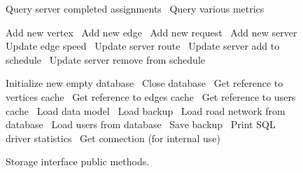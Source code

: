\documentclass{article}
\newcommand{\hi}[1]{\noindent {\bf #1}}     %
\def\nwendcode{\endtrivlist \endgroup}      %
\let\nwdocspar=\par
\theoremstyle{definition}                   %
\begin{document}
\begin{figure}
{\begin{minipage}[t]{0.5\textwidth}
\LA{}Query server completed assignments~{\nwtagstyle{}}\RA{}
\LA{}Query various metrics~{\nwtagstyle{}}\RA{}
\nwendcode{}\nwdocspar
\end{minipage}
\begin{minipage}[t]{0.5\textwidth}
\hi{Write Methods}
\nwenddocs{}\plusendmoddef
\LA{}Add new vertex~{\nwtagstyle{}}\RA{}
\LA{}Add new edge~{\nwtagstyle{}}\RA{}
\LA{}Add new request~{\nwtagstyle{}}\RA{}
\LA{}Add new server~{\nwtagstyle{}}\RA{}
\LA{}Update edge speed~{\nwtagstyle{}}\RA{}
\LA{}Update server route~{\nwtagstyle{}}\RA{}
\LA{}Update server add to schedule~{\nwtagstyle{}}\RA{}
\LA{}Update server remove from schedule~{\nwtagstyle{}}\RA{}
\nwendcode{}\nwdocspar
\hi{Utilities}
\nwenddocs{}\plusendmoddef
\LA{}Initialize new empty database~{\nwtagstyle{}}\RA{}
\LA{}Close database~{\nwtagstyle{}}\RA{}
\LA{}Get reference to vertices cache~{\nwtagstyle{}}\RA{}
\LA{}Get reference to edges cache~{\nwtagstyle{}}\RA{}
\LA{}Get reference to users cache~{\nwtagstyle{}}\RA{}
\LA{}Load data model~{\nwtagstyle{}}\RA{}
\LA{}Load backup~{\nwtagstyle{}}\RA{}
\LA{}Load road network from database~{\nwtagstyle{}}\RA{}
\LA{}Load users from database~{\nwtagstyle{}}\RA{}
\LA{}Save backup~{\nwtagstyle{}}\RA{}
\LA{}Print SQL driver statistics~{\nwtagstyle{}}\RA{}
\LA{}Get connection (for internal use)~{\nwtagstyle{}}\RA{}
\nwendcode{}\nwdocspar
\end{minipage}
}
\caption{Storage interface public methods.}
\label{fig:methods}
\end{figure}
\end{document}
